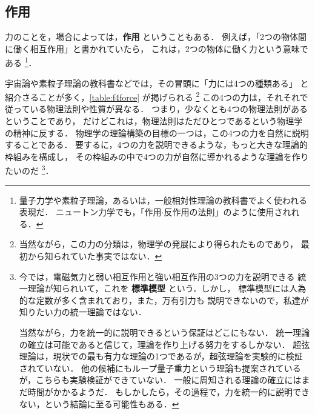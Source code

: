         \subsection{作用}
            力のことを，場合によっては，\textbf{作用} ということもある．
            例えば，「2つの物体間に働く相互作用」と書かれていたら，
            これは，2つの物体に働く力という意味である
                \footnote{
                    量子力学や素粒子理論，あるいは，一般相対性理論の教科書でよく使われる表現だ．
                    ニュートン力学でも，「作用$\cdot$反作用の法則」のように使用されれる．
                }．

            宇宙論や素粒子理論の教科書などでは，その冒頭に「力には4つの種類ある」
            と紹介さることが多く，\Table\ref{table:f4force} が掲げられる
                \footnote{
                    当然ながら，この力の分類は，物理学の発展により得られたものであり，
                    最初から知られていた事実ではない．
                }
            この4つの力は，それそれで従っている物理法則や性質が異なる．
            つまり，少なくとも4つの物理法則があるということであり，
            だけどこれは，物理法則はただひとつであるという物理学の精神に反する．
            物理学の理論構築の目標の一つは，この4つの力を自然に説明することである．
            要するに，4つの力を説明できるような，もっと大きな理論的枠組みを構成し，
            その枠組みの中で4つの力が自然に導かれるような理論を作りたいのだ
                \footnote{
                    今では，電磁気力と弱い相互作用と強い相互作用の3つの力を説明できる
                    統一理論が知られいて，これを \textbf{標準模型} という．しかし，
                    標準模型には人為的な定数が多く含まれており，また，万有引力も
                    説明できないので，私達が知りたい力の統一理論ではない．

                    当然ながら，力を統一的に説明できるという保証はどこにもない．
                    統一理論の確立は可能であると信じて，理論を作り上げる努力をするしかない．
                    超弦理論は，現状での最も有力な理論の1つであるが，超弦理論を実験的に検証されていない．
                    他の候補にもループ量子重力という理論も提案されているが，こちらも実験検証ができていない．
                    一般に周知される理論の確立にはまだ時間がかかるようだ．
                    もしかしたら，その過程で，力を統一的に説明できない，という結論に至る可能性もある．

                }．

